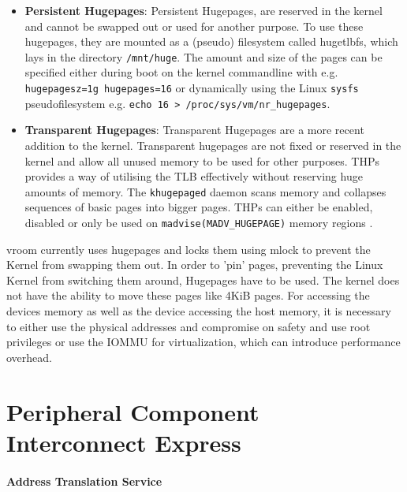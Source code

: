 \begin{itemize}
    \item \textbf{Persistent Hugepages}: Persistent Hugepages, are reserved in the kernel and cannot be swapped out or used for another purpose. To use these hugepages, they are mounted as a (pseudo) filesystem called hugetlbfs, which lays in the directory \texttt{/mnt/huge}. The amount and size of the pages can be specified either during boot on the kernel commandline with e.g. \texttt{hugepagesz=1g hugepages=16} or dynamically using the Linux \texttt{sysfs} pseudofilesystem e.g. \texttt{echo 16 > /proc/sys/vm/nr\_hugepages}\cite{hugetlbkerneldocs}.
    \item \textbf{Transparent Hugepages}: Transparent Hugepages are a more recent addition to the kernel. Transparent hugepages are not fixed or reserved in the kernel and allow all unused memory to be used for other purposes. THPs provides a way of utilising the TLB effectively without reserving huge amounts of memory. The \texttt{khugepaged} daemon scans memory and collapses sequences of basic pages into bigger pages. THPs can either be enabled, disabled or only be used on \texttt{madvise(MADV\_HUGEPAGE)} memory regions \cite{transhugekerneldocs}.
\end{itemize}

vroom currently uses hugepages and locks them using mlock to prevent the Kernel from swapping them out. In order to 'pin' pages, preventing the Linux Kernel from switching them around, Hugepages have to be used. The kernel does not have the ability to move these pages like 4KiB pages.
For accessing the devices memory as well as the device accessing the host memory, it is necessary to either use the physical addresses and compromise on safety and use root privileges or use the IOMMU for virtualization, which can introduce performance overhead.

\section{Peripheral Component Interconnect Express}
\paragraph{Address Translation Service}


